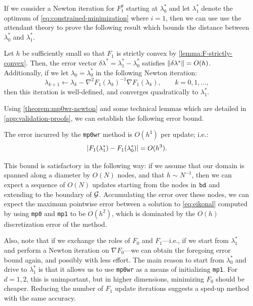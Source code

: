 \documentclass[sisc-eikonal.tex]{subfiles}
\begin{document}
If we consider a Newton iteration for $F_1^\theta$ starting at
$\lambda_0^*$ and let $\lambda_1^*$ denote the optimum of
\cref{eq:constrained-minimization} where $i = 1$, then we can use use
the attendant theory to prove the following result which bounds the
distance between $\lambda_0^*$ and $\lambda_1^*$.

\begin{theorem}\label{theorem:mp0wr-newton}
  Let $h$ be sufficiently small so that $F_1$ is strictly convex by
  \cref{lemma:F-strictly-convex}. Then, the error vector
  $\delta\lambda^* = \lambda_1^* - \lambda_0^*$ satisfies
  $\left\|\delta\lambda^*\right\| = O(h)$. Additionally, if we let
  $\lambda_0 = \lambda_0^*$ in the following Newton iteration:
  \begin{equation}
    \label{eq:lam0-iter-to-lam1}
    \lambda_{k+1} \gets \lambda_k - \nabla^2 F_1(\lambda_k)^{-1} \nabla F_1(\lambda_k), \qquad k = 0, 1, \hdots,
  \end{equation}
  then this iteration is well-defined, and converges quadratically to
  $\lambda_1^*$.
\end{theorem}

Using \cref{theorem:mp0wr-newton} and some technical lemmas which are
detailed in \cref{app:validation-proofs}, we can establish the
following error bound.

\begin{theorem}\label{thm:mp0wr-error}
  The error incurred by the \texttt{mp0wr} method is $O(h^3)$ per
  update; i.e.:
  \begin{equation}
    \label{eq:mp0wr-error}
    \abs{F_1(\lambda_1^*) - F_1(\lambda_0^*)} = O(h^3).
  \end{equation}
\end{theorem}

This bound is satisfactory in the following way: if we assume that our
domain is spanned along a diameter by $O(N)$ nodes, and that
$h \sim N^{-1}$, then we can expect a sequence of $O(N)$ updates
starting from the nodes in $\texttt{bd}$ and extending to the boundary
of $\mathcal{G}$. Accumulating the error over these nodes, we can expect the
maximum pointwise error between a solution to \cref{eq:eikonal}
computed by using \texttt{mp0} and \texttt{mp1} to be $O(h^2)$, which
is dominated by the $O(h)$ discretization error of the method.

Also, note that if we exchange the roles of $F_0$ and $F_1$---i.e., if
we start from $\lambda_1^*$ and perform a Newton iteration on
$\nabla F_0$---we can obtain the foregoing error bound again, and
possibly with less effort. The main reason to start from $\lambda_0^*$
and drive to $\lambda_1^*$ is that it allows us to use \texttt{mp0wr}
as a means of initializing \texttt{mp1}. For $d = 1, 2$, this is
unimportant, but in higher dimensions, minimizing $F_0$ should be
cheaper. Reducing the number of $F_1$ update iterations suggests a
sped-up method with the same accuracy.
\end{document}
